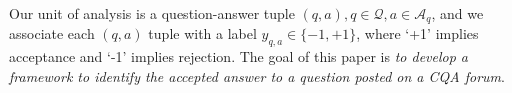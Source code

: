 Our unit of analysis is a question-answer tuple $(q,a), q \in \mathcal{Q}, a \in \mathcal{A}_q$, and we associate each $(q,a)$ tuple with a label $y_{q,a} \in \{-1,+1\}$, where `+1' implies acceptance and `-1' implies rejection. The goal of this paper is \textit{to develop a framework to identify the accepted answer to a question posted on a CQA forum}.




